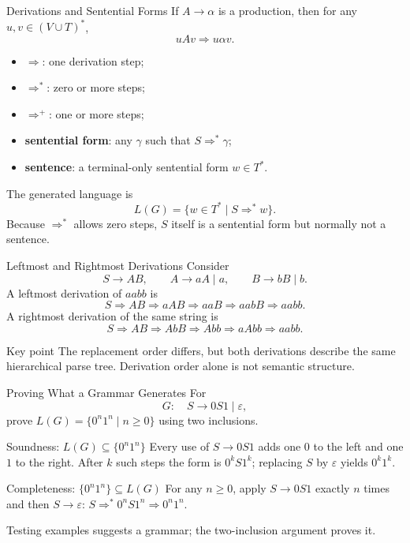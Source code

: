 \documentclass[10pt]{beamer}
\begin{document}
\begin{frame}{Derivations and Sentential Forms}
  If $A\to\alpha$ is a production, then for any $u,v\in(V\cup T)^*$,
  \[
    uAv\Rightarrow u\alpha v.
  \]
  \begin{itemize}
    \item $\Rightarrow$: one derivation step;
    \item $\Rightarrow^*$: zero or more steps;
    \item $\Rightarrow^+$: one or more steps;
    \item \textbf{sentential form}: any $\gamma$ such that $S\Rightarrow^*\gamma$;
    \item \textbf{sentence}: a terminal-only sentential form $w\in T^*$.
  \end{itemize}
  \pause
  The generated language is
  \[
    L(G)=\{w\in T^*\mid S\Rightarrow^*w\}.
  \]
  Because $\Rightarrow^*$ allows zero steps, $S$ itself is a sentential form but normally not a sentence.
\end{frame}

\begin{frame}{Leftmost and Rightmost Derivations}
  Consider
  \[
    S\to AB,\qquad A\to aA\mid a,\qquad B\to bB\mid b.
  \]
  A leftmost derivation of $aabb$ is
  \[
    S\Rightarrow AB\Rightarrow aAB\Rightarrow aaB
      \Rightarrow aabB\Rightarrow aabb.
  \]
  \pause
  A rightmost derivation of the same string is
  \[
    S\Rightarrow AB\Rightarrow AbB\Rightarrow Abb
      \Rightarrow aAbb\Rightarrow aabb.
  \]
  \begin{block}{Key point}
    The replacement order differs, but both derivations describe the same hierarchical parse tree.
    Derivation order alone is not semantic structure.
  \end{block}
\end{frame}

\begin{frame}{Proving What a Grammar Generates}
  For
  \[
    G:\quad S\to0S1\mid\varepsilon,
  \]
  prove $L(G)=\{0^n1^n\mid n\ge0\}$ using two inclusions.
  \begin{block}{Soundness: $L(G)\subseteq\{0^n1^n\}$}
    Every use of $S\to0S1$ adds one $0$ to the left and one $1$ to the right.
    After $k$ such steps the form is $0^kS1^k$; replacing $S$ by $\varepsilon$
    yields $0^k1^k$.
  \end{block}
  \pause
  \begin{block}{Completeness: $\{0^n1^n\}\subseteq L(G)$}
    For any $n\ge0$, apply $S\to0S1$ exactly $n$ times and then
    $S\to\varepsilon$:
    $S\Rightarrow^*0^nS1^n\Rightarrow0^n1^n$.
  \end{block}
  Testing examples suggests a grammar; the two-inclusion argument proves it.
\end{frame}
\end{document}
